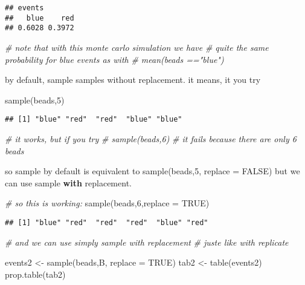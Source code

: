 \documentclass[
]{book}
\newenvironment{Shaded}{\begin{snugshade}}{\end{snugshade}}
\newcommand{\AttributeTok}[1]{\textcolor[rgb]{0.77,0.63,0.00}{#1}}
\newcommand{\CommentTok}[1]{\textcolor[rgb]{0.56,0.35,0.01}{\textit{#1}}}
\newcommand{\ConstantTok}[1]{\textcolor[rgb]{0.00,0.00,0.00}{#1}}
\newcommand{\DecValTok}[1]{\textcolor[rgb]{0.00,0.00,0.81}{#1}}
\newcommand{\FunctionTok}[1]{\textcolor[rgb]{0.00,0.00,0.00}{#1}}
\newcommand{\NormalTok}[1]{#1}
\newcommand{\OtherTok}[1]{\textcolor[rgb]{0.56,0.35,0.01}{#1}}
\begin{document}
\begin{verbatim}
## events
##   blue    red 
## 0.6028 0.3972
\end{verbatim}

\begin{Shaded}
\begin{Highlighting}[]
\CommentTok{\# note that with this monte carlo simulation we have }
\CommentTok{\# quite the same probability for blue events as with}
\CommentTok{\# mean(beads =="blue")}
\end{Highlighting}
\end{Shaded}

by default, sample samples without replacement.
it means, it you try

\begin{Shaded}
\begin{Highlighting}[]
\FunctionTok{sample}\NormalTok{(beads,}\DecValTok{5}\NormalTok{)}
\end{Highlighting}
\end{Shaded}

\begin{verbatim}
## [1] "blue" "red"  "red"  "blue" "blue"
\end{verbatim}

\begin{Shaded}
\begin{Highlighting}[]
\CommentTok{\# it works, but if you try}
\CommentTok{\# sample(beads,6)}
\CommentTok{\# it fails because there are only 6 beads}
\end{Highlighting}
\end{Shaded}

so sample by default is equivalent to
sample(beads,5, replace = FALSE)
but we can use sample \textbf{with} replacement.

\begin{Shaded}
\begin{Highlighting}[]
\CommentTok{\# so this is working:}
\FunctionTok{sample}\NormalTok{(beads,}\DecValTok{6}\NormalTok{,}\AttributeTok{replace =} \ConstantTok{TRUE}\NormalTok{)}
\end{Highlighting}
\end{Shaded}

\begin{verbatim}
## [1] "blue" "red"  "red"  "red"  "blue" "red"
\end{verbatim}

\begin{Shaded}
\begin{Highlighting}[]
\CommentTok{\# and we can use simply sample with replacement}
\CommentTok{\# juste like with replicate}

\NormalTok{events2 }\OtherTok{\textless{}{-}} \FunctionTok{sample}\NormalTok{(beads,B, }\AttributeTok{replace =} \ConstantTok{TRUE}\NormalTok{)}
\NormalTok{tab2 }\OtherTok{\textless{}{-}} \FunctionTok{table}\NormalTok{(events2)}
\FunctionTok{prop.table}\NormalTok{(tab2)}
\end{Highlighting}
\end{Shaded}
\end{document}
